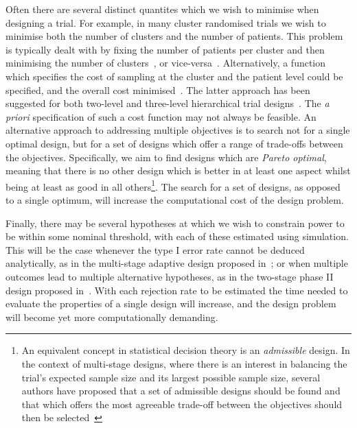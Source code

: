 \documentclass{article} %
\begin{document}
Often there are several distinct quantites which we wish to minimise when designing a trial. For example, in many cluster randomised trials we wish to minimise both the number of clusters and the number of patients. This problem is typically dealt with by fixing the number of patients per cluster and then minimising the number of clusters~\cite{Donner2000}, or vice-versa~\cite{Hemming2011}. Alternatively, a function which specifies the cost of sampling at the cluster and the patient level could be specified, and the overall cost minimised~\cite{Snijders1993}. The latter approach has been suggested for both two-level and three-level hierarchical trial designs~\cite{Breukelen2012, Teerenstra2008}. The \emph{a priori} specification of such a cost function may not always be feasible. An alternative approach to addressing multiple objectives is to search not for a single optimal design, but for a set of designs which offer a range of trade-offs between the objectives. Specifically, we aim to find designs which are \emph{Pareto optimal}, meaning that there is no other design which is better in at least one aspect whilst being at least as good in all others\footnote{An equivalent concept in statistical decision theory is an \emph{admissible} design. In the context of multi-stage designs, where there is an interest in balancing the trial's expected sample size and its largest possible sample size, several authors have proposed that a set of admissible designs should be found and that which offers the most agreeable trade-off between the objectives should then be selected~\cite{Jung2004, Mander2012}}. 
The search for a set of designs, as opposed to a single optimum, will increase the computational cost of the design problem.

Finally, there may be several hypotheses at which we wish to constrain power to be within some nominal threshold, with each of these estimated using simulation. This will be the case whenever the type I error rate cannot be deduced analytically, as in the multi-stage adaptive design proposed in~\cite{Wason2011}; or when multiple outcomes lead to multiple alternative hypotheses, as in the two-stage phase II design proposed in~\cite{Sill2012}. With each rejection rate to be estimated the time needed to evaluate the properties of a single design will increase, and the design problem will become yet more computationally demanding.
\end{document}
